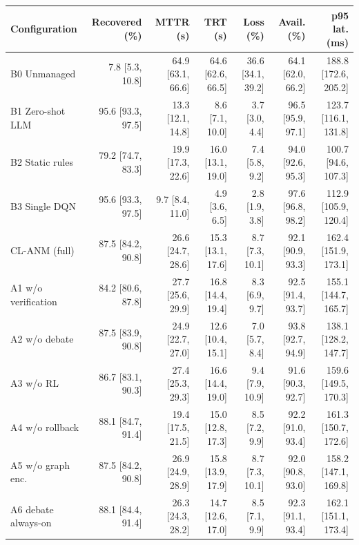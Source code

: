 \begin{tabular}{lrrrrrr}
\toprule
Configuration & Recovered (\%) & MTTR (s) & TRT (s) & Loss (\%) & Avail. (\%) & p95 lat. (ms) \\
\midrule
B0 Unmanaged & 7.8 [5.3, 10.8] & 64.9 [63.1, 66.6] & 64.6 [62.6, 66.5] & 36.6 [34.1, 39.2] & 64.1 [62.0, 66.2] & 188.8 [172.6, 205.2] \\
B1 Zero-shot LLM & 95.6 [93.3, 97.5] & 13.3 [12.1, 14.8] & 8.6 [7.1, 10.0] & 3.7 [3.0, 4.4] & 96.5 [95.9, 97.1] & 123.7 [116.1, 131.8] \\
B2 Static rules & 79.2 [74.7, 83.3] & 19.9 [17.3, 22.6] & 16.0 [13.1, 19.0] & 7.4 [5.8, 9.2] & 94.0 [92.6, 95.3] & 100.7 [94.6, 107.3] \\
B3 Single DQN & 95.6 [93.3, 97.5] & 9.7 [8.4, 11.0] & 4.9 [3.6, 6.5] & 2.8 [1.9, 3.8] & 97.6 [96.8, 98.2] & 112.9 [105.9, 120.4] \\
CL-ANM (full) & 87.5 [84.2, 90.8] & 26.6 [24.7, 28.6] & 15.3 [13.1, 17.6] & 8.7 [7.3, 10.1] & 92.1 [90.9, 93.3] & 162.4 [151.9, 173.1] \\
A1 w/o verification & 84.2 [80.6, 87.8] & 27.7 [25.6, 29.9] & 16.8 [14.4, 19.4] & 8.3 [6.9, 9.7] & 92.5 [91.4, 93.7] & 155.1 [144.7, 165.7] \\
A2 w/o debate & 87.5 [83.9, 90.8] & 24.9 [22.7, 27.0] & 12.6 [10.4, 15.1] & 7.0 [5.7, 8.4] & 93.8 [92.7, 94.9] & 138.1 [128.2, 147.7] \\
A3 w/o RL & 86.7 [83.1, 90.3] & 27.4 [25.3, 29.3] & 16.6 [14.4, 19.0] & 9.4 [7.9, 10.9] & 91.6 [90.3, 92.7] & 159.6 [149.5, 170.3] \\
A4 w/o rollback & 88.1 [84.7, 91.4] & 19.4 [17.5, 21.5] & 15.0 [12.8, 17.3] & 8.5 [7.2, 9.9] & 92.2 [91.0, 93.4] & 161.3 [150.7, 172.6] \\
A5 w/o graph enc. & 87.5 [84.2, 90.8] & 26.9 [24.9, 28.9] & 15.8 [13.9, 17.9] & 8.7 [7.3, 10.1] & 92.0 [90.8, 93.0] & 158.2 [147.1, 169.8] \\
A6 debate always-on & 88.1 [84.4, 91.4] & 26.3 [24.3, 28.2] & 14.7 [12.6, 17.0] & 8.5 [7.1, 9.9] & 92.3 [91.1, 93.4] & 162.1 [151.1, 173.4] \\
\bottomrule
\end{tabular}
